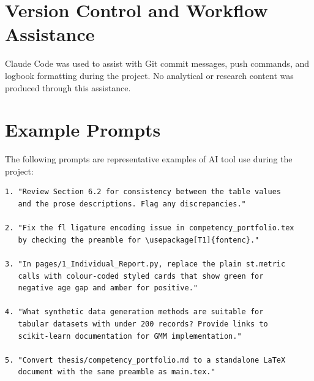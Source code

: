 \documentclass[11pt,a4paper]{report}
\begin{document}
\begin{appendices}
\section{Version Control and Workflow Assistance}

Claude Code was used to assist with Git commit messages, push commands, and logbook formatting during the project. No analytical or research content was produced through this assistance.

\section{Example Prompts}

The following prompts are representative examples of AI tool use during the project:

\begin{verbatim}
1. "Review Section 6.2 for consistency between the table values
   and the prose descriptions. Flag any discrepancies."

2. "Fix the fl ligature encoding issue in competency_portfolio.tex
   by checking the preamble for \usepackage[T1]{fontenc}."

3. "In pages/1_Individual_Report.py, replace the plain st.metric
   calls with colour-coded styled cards that show green for
   negative age gap and amber for positive."

4. "What synthetic data generation methods are suitable for
   tabular datasets with under 200 records? Provide links to
   scikit-learn documentation for GMM implementation."

5. "Convert thesis/competency_portfolio.md to a standalone LaTeX
   document with the same preamble as main.tex."
\end{verbatim}

\end{appendices}
\end{document}
